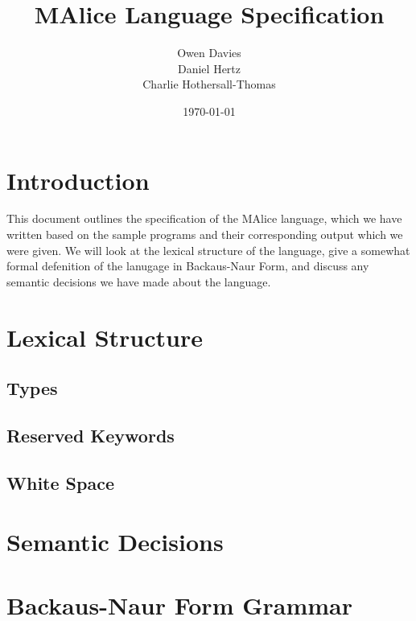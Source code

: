 \documentclass[a4, 11pt]{article}
\begin{document}
\title{\huge{MAlice Language Specification}}
\author{Owen Davies\\Daniel Hertz\\Charlie Hothersall-Thomas}
\date{\today}

\maketitle

\section*{Introduction}
This document outlines the specification of the MAlice language, which we have 
written based on the sample programs and their corresponding output which we 
were given. We will look at the lexical structure of the language, give a 
somewhat formal defenition of the lanugage in Backaus-Naur Form, and discuss 
any semantic decisions we have made about the language.

\section*{Lexical Structure}
\subsection*{Types}
\subsection*{Reserved Keywords}
\subsection*{White Space}

\section*{Semantic Decisions}

\section*{Backaus-Naur Form Grammar} 
\end{document}
